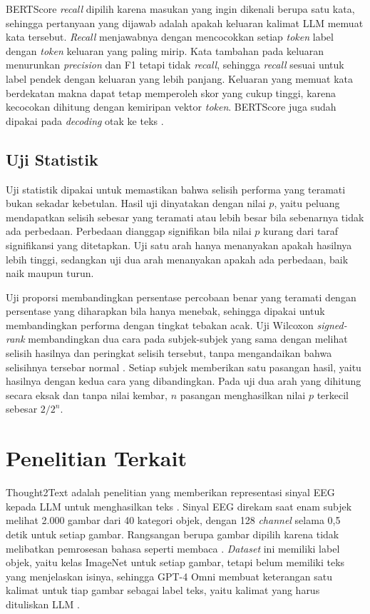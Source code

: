 BERTScore \textit{recall} dipilih karena masukan yang ingin dikenali berupa satu kata, sehingga pertanyaan yang dijawab adalah apakah keluaran kalimat LLM memuat kata tersebut.
\textit{Recall} menjawabnya dengan mencocokkan setiap \textit{token} label dengan \textit{token} keluaran yang paling mirip.
Kata tambahan pada keluaran menurunkan \textit{precision} dan F1 tetapi tidak \textit{recall}, sehingga \textit{recall} sesuai untuk label pendek dengan keluaran yang lebih panjang.
Keluaran yang memuat kata berdekatan makna dapat tetap memperoleh skor yang cukup tinggi, karena kecocokan dihitung dengan kemiripan vektor \textit{token}.
BERTScore juga sudah dipakai pada \textit{decoding} otak ke teks \parencite{mishra2025,yang2026cliplm}.

\subsection{Uji Statistik}
\label{sec:uji-statistik}
Uji statistik dipakai untuk memastikan bahwa selisih performa yang teramati bukan sekadar kebetulan.
Hasil uji dinyatakan dengan nilai $p$, yaitu peluang mendapatkan selisih sebesar yang teramati atau lebih besar bila sebenarnya tidak ada perbedaan.
Perbedaan dianggap signifikan bila nilai $p$ kurang dari taraf signifikansi yang ditetapkan.
Uji satu arah hanya menanyakan apakah hasilnya lebih tinggi, sedangkan uji dua arah menanyakan apakah ada perbedaan, baik naik maupun turun.

Uji proporsi membandingkan persentase percobaan benar yang teramati dengan persentase yang diharapkan bila hanya menebak, sehingga dipakai untuk membandingkan performa dengan tingkat tebakan acak.
Uji Wilcoxon \textit{signed-rank} membandingkan dua cara pada subjek-subjek yang sama dengan melihat selisih hasilnya dan peringkat selisih tersebut, tanpa mengandaikan bahwa selisihnya tersebar normal \parencite{wilcoxon1945}.
Setiap subjek memberikan satu pasangan hasil, yaitu hasilnya dengan kedua cara yang dibandingkan.
Pada uji dua arah yang dihitung secara eksak dan tanpa nilai kembar, $n$ pasangan menghasilkan nilai $p$ terkecil sebesar $2/2^{n}$.

\section{Penelitian Terkait}
\label{sec:penelitian-terkait}
Thought2Text adalah penelitian yang memberikan representasi sinyal EEG kepada LLM untuk menghasilkan teks \parencite{mishra2025}.
Sinyal EEG direkam saat enam subjek melihat 2.000 gambar dari 40 kategori objek, dengan 128 \textit{channel} selama 0,5 detik untuk setiap gambar.
Rangsangan berupa gambar dipilih karena tidak melibatkan pemrosesan bahasa seperti membaca \parencite{mishra2025}.
\textit{Dataset} ini memiliki label objek, yaitu kelas ImageNet untuk setiap gambar, tetapi belum memiliki teks yang menjelaskan isinya, sehingga GPT-4 Omni membuat keterangan satu kalimat untuk tiap gambar sebagai label teks, yaitu kalimat yang harus dituliskan LLM \parencite{mishra2025}.

